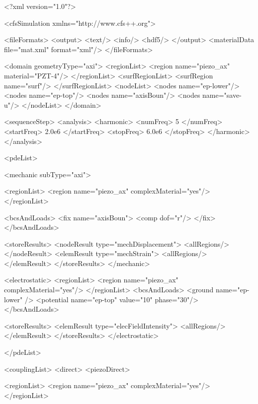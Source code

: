 {\footnotesize
\begin{xmllisting}
<?xml version="1.0"?>

<cfsSimulation xmlns="http://www.cfs++.org">

  <fileFormats>
    <output>
      <text/>
      <info/>
      <hdf5/>
    </output>
    <materialData file="mat.xml" format="xml"/>
  </fileFormats>

  <domain geometryType="axi">
    <regionList>
      <region name="piezo_ax" material="PZT-4"/>
    </regionList>
    <surfRegionList>
      <surfRegion name="surf"/>
    </surfRegionList>
    <nodeList>
      <nodes name="ep-lower"/>
      <nodes name="ep-top"/>
      <nodes name="axisBoun"/>
      <nodes name="save-u"/>
    </nodeList>
  </domain>

  <sequenceStep>
    <analysis>
      <harmonic>
        <numFreq>     5       </numFreq>
        <startFreq>   2.0e6   </startFreq>
        <stopFreq>    6.0e6   </stopFreq>
      </harmonic>
    </analysis>

    <pdeList>
      
      <mechanic subType="axi">

        <regionList>
          <region name="piezo_ax" complexMaterial="yes"/>
        </regionList>

        <bcsAndLoads>
          <fix name="axisBoun">
            <comp dof="r"/>
          </fix>
        </bcsAndLoads>

        <storeResults>
          <nodeResult type="mechDisplacement">
            <allRegions/>
          </nodeResult>
          <elemResult type="mechStrain">
            <allRegions/>
          </elemResult>
        </storeResults>
      </mechanic>
      
      <electrostatic>
        <regionList>
          <region name="piezo_ax" complexMaterial="yes"/>
        </regionList>
        <bcsAndLoads>
          <ground name="ep-lower" />
          <potential name="ep-top" value="10" phase="30"/>
        </bcsAndLoads>
        
        <storeResults>
          <elemResult type="elecFieldIntensity">
            <allRegions/>
          </elemResult>
        </storeResults>
      </electrostatic>

    </pdeList>
    
    <couplingList>
      <direct>
        <piezoDirect>
          
          <regionList>
            <region name="piezo_ax" complexMaterial="yes"/>
          </regionList>


\end{xmllisting}}
